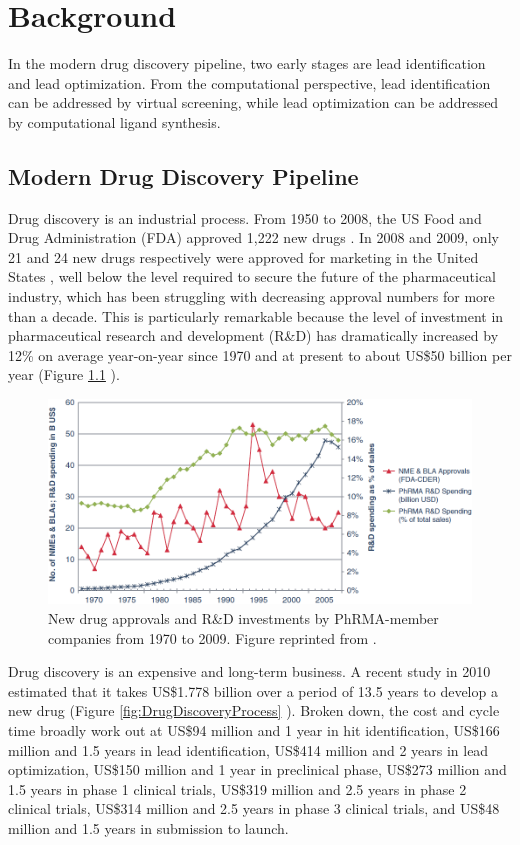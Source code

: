 \chapter{Background}

In the modern drug discovery pipeline, two early stages are lead identification and lead optimization. From the computational perspective, lead identification can be addressed by virtual screening, while lead optimization can be addressed by computational ligand synthesis.

\section{Modern Drug Discovery Pipeline}

Drug discovery is an industrial process. From 1950 to 2008, the US Food and Drug Administration (FDA) approved 1,222 new drugs \citep{717}. In 2008 and 2009, only 21 and 24 new drugs respectively were approved for marketing in the United States \citep{716}, well below the level required to secure the future of the pharmaceutical industry, which has been struggling with decreasing approval numbers for more than a decade. This is particularly remarkable because the level of investment in pharmaceutical research and development (R\&D) has dramatically increased by 12\% on average year-on-year since 1970 and at present to about US\$50 billion per year (Figure \ref{fig:NewDrugApprovals} \citep{686}).

\begin{figure}
\centering
\includegraphics[width=\textwidth]{Background/NewDrugApprovals.png}
\caption{New drug approvals and R\&D investments by PhRMA-member companies from 1970 to 2009. Figure reprinted from \citep{686}.}
\label{fig:NewDrugApprovals}
\end{figure}

Drug discovery is an expensive and long-term business. A recent study in 2010 estimated that it takes US\$1.778 billion over a period of 13.5 years to develop a new drug (Figure \ref{fig:DrugDiscoveryProcess} \citep{716}). Broken down, the cost and cycle time broadly work out at US\$94 million and 1 year in hit identification, US\$166 million and 1.5 years in lead identification, US\$414 million and 2 years in lead optimization, US\$150 million and 1 year in preclinical phase, US\$273 million and 1.5 years in phase 1 clinical trials, US\$319 million and 2.5 years in phase 2 clinical trials, US\$314 million and 2.5 years in phase 3 clinical trials, and US\$48 million and 1.5 years in submission to launch.

